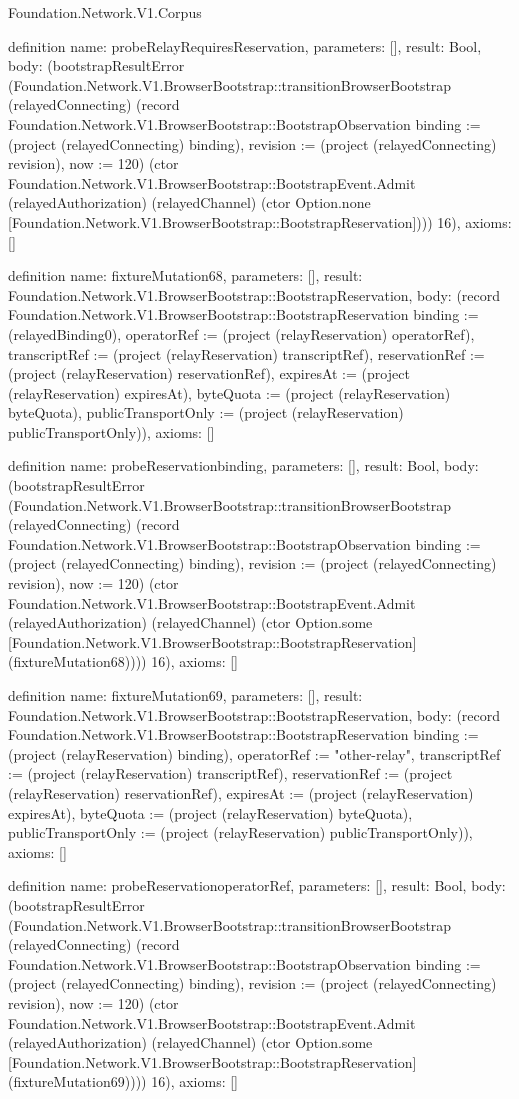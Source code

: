 \begin{lexlean}{Foundation.Network.V1.Corpus}
\begin{semanticmodule}
definition{
  name: probeRelayRequiresReservation,
  parameters: [],
  result: Bool,
  body: (bootstrapResultError (Foundation.Network.V1.BrowserBootstrap::transitionBrowserBootstrap (relayedConnecting) (record Foundation.Network.V1.BrowserBootstrap::BootstrapObservation {binding := (project (relayedConnecting) binding), revision := (project (relayedConnecting) revision), now := 120}) (ctor Foundation.Network.V1.BrowserBootstrap::BootstrapEvent.Admit (relayedAuthorization) (relayedChannel) (ctor Option.none [Foundation.Network.V1.BrowserBootstrap::BootstrapReservation]))) 16),
  axioms: []
}

definition{
  name: fixtureMutation68,
  parameters: [],
  result: Foundation.Network.V1.BrowserBootstrap::BootstrapReservation,
  body: (record Foundation.Network.V1.BrowserBootstrap::BootstrapReservation {binding := (relayedBinding0), operatorRef := (project (relayReservation) operatorRef), transcriptRef := (project (relayReservation) transcriptRef), reservationRef := (project (relayReservation) reservationRef), expiresAt := (project (relayReservation) expiresAt), byteQuota := (project (relayReservation) byteQuota), publicTransportOnly := (project (relayReservation) publicTransportOnly)}),
  axioms: []
}

definition{
  name: probeReservationbinding,
  parameters: [],
  result: Bool,
  body: (bootstrapResultError (Foundation.Network.V1.BrowserBootstrap::transitionBrowserBootstrap (relayedConnecting) (record Foundation.Network.V1.BrowserBootstrap::BootstrapObservation {binding := (project (relayedConnecting) binding), revision := (project (relayedConnecting) revision), now := 120}) (ctor Foundation.Network.V1.BrowserBootstrap::BootstrapEvent.Admit (relayedAuthorization) (relayedChannel) (ctor Option.some [Foundation.Network.V1.BrowserBootstrap::BootstrapReservation] (fixtureMutation68)))) 16),
  axioms: []
}

definition{
  name: fixtureMutation69,
  parameters: [],
  result: Foundation.Network.V1.BrowserBootstrap::BootstrapReservation,
  body: (record Foundation.Network.V1.BrowserBootstrap::BootstrapReservation {binding := (project (relayReservation) binding), operatorRef := "other-relay", transcriptRef := (project (relayReservation) transcriptRef), reservationRef := (project (relayReservation) reservationRef), expiresAt := (project (relayReservation) expiresAt), byteQuota := (project (relayReservation) byteQuota), publicTransportOnly := (project (relayReservation) publicTransportOnly)}),
  axioms: []
}

definition{
  name: probeReservationoperatorRef,
  parameters: [],
  result: Bool,
  body: (bootstrapResultError (Foundation.Network.V1.BrowserBootstrap::transitionBrowserBootstrap (relayedConnecting) (record Foundation.Network.V1.BrowserBootstrap::BootstrapObservation {binding := (project (relayedConnecting) binding), revision := (project (relayedConnecting) revision), now := 120}) (ctor Foundation.Network.V1.BrowserBootstrap::BootstrapEvent.Admit (relayedAuthorization) (relayedChannel) (ctor Option.some [Foundation.Network.V1.BrowserBootstrap::BootstrapReservation] (fixtureMutation69)))) 16),
  axioms: []
}


\end{semanticmodule}
\end{lexlean}
